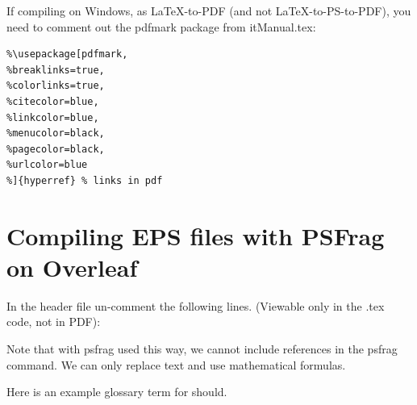 
If compiling on Windows, as LaTeX-to-PDF (and not LaTeX-to-PS-to-PDF), 
you need to comment out the pdfmark package from itManual.tex:

\begin{verbatim}
%\usepackage[pdfmark, 
%breaklinks=true, 
%colorlinks=true,
%citecolor=blue,
%linkcolor=blue,
%menucolor=black,
%pagecolor=black,
%urlcolor=blue
%]{hyperref} % links in pdf
\end{verbatim}

\section{Compiling EPS files with PSFrag on Overleaf}

In the header file un-comment the following lines. (Viewable only in the .tex code, not in PDF):


Note that with psfrag used this way, we cannot include references in the psfrag command.  
We can only replace text and use mathematical formulas.

Here is an example glossary term for \gls{should}.